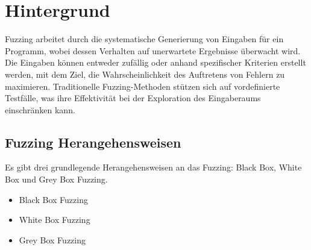 
\section{Hintergrund}\label{sec:hintergrund}
Fuzzing arbeitet durch die systematische Generierung von Eingaben für ein Programm, wobei dessen Verhalten auf unerwartete
Ergebnisse überwacht wird.
Die Eingaben können entweder zufällig oder anhand spezifischer Kriterien erstellt werden, mit dem Ziel, die
Wahrscheinlichkeit des Auftretens von Fehlern zu maximieren.
Traditionelle Fuzzing-Methoden stützen sich auf vordefinierte Testfälle, was ihre Effektivität bei der Exploration
des Eingaberaums einschränken kann.
\subsection{Fuzzing Herangehensweisen}\label{subsec:testing-methoden}
Es gibt drei grundlegende Herangehensweisen an das Fuzzing: Black Box, White Box und Grey Box Fuzzing.
\begin{itemize}
    \item Black Box Fuzzing
    \item White Box Fuzzing
    \item Grey Box Fuzzing
\end{itemize}
